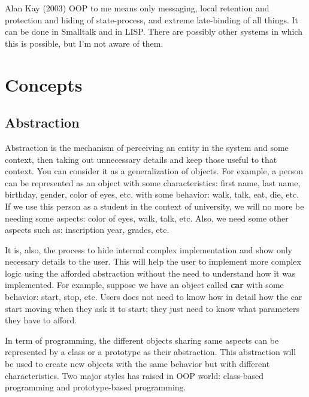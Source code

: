 \documentclass[12pt]{book}
\begin{document}
\begin{kodequote}{Alan Kay (2003)}
	OOP to me means only messaging, local retention and protection and hiding of state-process, and extreme late-binding of all things. 
	It can be done in Smalltalk and in LISP. 
	There are possibly other systems in which this is possible, but I'm not aware of them.
\end{kodequote}




\section{Concepts}

\subsection{Abstraction}

Abstraction is the mechanism of perceiving an entity in the system and some context, then taking out unnecessary details and keep those useful to that context.
You can consider it as a generalization of objects.
For example, a person can be represented as an object with some characteristics: first name, last name, birthday, gender, color of eyes, etc. with some behavior: walk, talk, eat, die, etc. 
If we use this person as a student in the context of university, we will no more be needing some aspects: color of eyes, walk, talk, etc. 
Also, we need some other aspects such as: inscription year, grades, etc. 

It is, also, the process to hide internal complex implementation and show only necessary details to the user. 
This will help the user to implement more complex logic using the afforded abstraction without the need to understand how it was implemented.
For example, suppose we have an object called \textbf{car} with some behavior: start, stop, etc. 
Users does not need to know how in detail how the car start moving when they ask it to start; they just need to know what parameters they have to afford.

In term of programming, the different objects sharing same aspects can be represented by a class or a prototype as their abstraction. 
This abstraction will be used to create new objects with the same behavior but with different characteristics. 
Two major styles has raised in OOP world: class-based programming and prototype-based programming.
\end{document}
